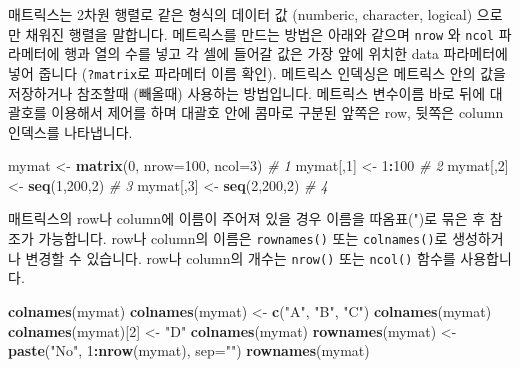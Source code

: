 \documentclass[
]{book}
\newenvironment{Shaded}{\begin{snugshade}}{\end{snugshade}}
\newcommand{\CommentTok}[1]{\textcolor[rgb]{0.56,0.35,0.01}{\textit{#1}}}
\newcommand{\DataTypeTok}[1]{\textcolor[rgb]{0.13,0.29,0.53}{#1}}
\newcommand{\DecValTok}[1]{\textcolor[rgb]{0.00,0.00,0.81}{#1}}
\newcommand{\KeywordTok}[1]{\textcolor[rgb]{0.13,0.29,0.53}{\textbf{#1}}}
\newcommand{\NormalTok}[1]{#1}
\newcommand{\OperatorTok}[1]{\textcolor[rgb]{0.81,0.36,0.00}{\textbf{#1}}}
\newcommand{\StringTok}[1]{\textcolor[rgb]{0.31,0.60,0.02}{#1}}
\begin{document}
매트릭스는 2차원 행렬로 같은 형식의 데이터 값 (numberic, character, logical) 으로만 채워진 행렬을 말합니다. 메트릭스를 만드는 방법은 아래와 같으며 \texttt{nrow} 와 \texttt{ncol} 파라메터에 행과 열의 수를 넣고 각 셀에 들어갈 값은 가장 앞에 위치한 data 파라메터에 넣어 줍니다 (\texttt{?matrix}로 파라메터 이름 확인). 메트릭스 인덱싱은 메트릭스 안의 값을 저장하거나 참조할때 (빼올때) 사용하는 방법입니다. 메트릭스 변수이름 바로 뒤에 대괄호를 이용해서 제어를 하며 대괄호 안에 콤마로 구분된 앞쪽은 row, 뒷쪽은 column 인덱스를 나타냅니다.

\begin{Shaded}
\begin{Highlighting}[]
\NormalTok{mymat <{-}}\StringTok{ }\KeywordTok{matrix}\NormalTok{(}\DecValTok{0}\NormalTok{, }\DataTypeTok{nrow=}\DecValTok{100}\NormalTok{, }\DataTypeTok{ncol=}\DecValTok{3}\NormalTok{) }\CommentTok{\# 1}
\NormalTok{mymat[,}\DecValTok{1}\NormalTok{] <{-}}\StringTok{ }\DecValTok{1}\OperatorTok{:}\DecValTok{100} \CommentTok{\# 2}
\NormalTok{mymat[,}\DecValTok{2}\NormalTok{] <{-}}\StringTok{ }\KeywordTok{seq}\NormalTok{(}\DecValTok{1}\NormalTok{,}\DecValTok{200}\NormalTok{,}\DecValTok{2}\NormalTok{) }\CommentTok{\# 3}
\NormalTok{mymat[,}\DecValTok{3}\NormalTok{] <{-}}\StringTok{ }\KeywordTok{seq}\NormalTok{(}\DecValTok{2}\NormalTok{,}\DecValTok{200}\NormalTok{,}\DecValTok{2}\NormalTok{) }\CommentTok{\# 4}
\end{Highlighting}
\end{Shaded}

매트릭스의 row나 column에 이름이 주어져 있을 경우 이름을 따옴표(")로 묶은 후 참조가 가능합니다. row나 column의 이름은 \texttt{rownames()} 또는 \texttt{colnames()}로 생성하거나 변경할 수 있습니다. row나 column의 개수는 \texttt{nrow()} 또는 \texttt{ncol()} 함수를 사용합니다.

\begin{Shaded}
\begin{Highlighting}[]
\KeywordTok{colnames}\NormalTok{(mymat)}
\KeywordTok{colnames}\NormalTok{(mymat) <{-}}\StringTok{ }\KeywordTok{c}\NormalTok{(}\StringTok{"A"}\NormalTok{, }\StringTok{"B"}\NormalTok{, }\StringTok{"C"}\NormalTok{)}
\KeywordTok{colnames}\NormalTok{(mymat)}
\KeywordTok{colnames}\NormalTok{(mymat)[}\DecValTok{2}\NormalTok{] <{-}}\StringTok{ "D"}
\KeywordTok{colnames}\NormalTok{(mymat)}
\KeywordTok{rownames}\NormalTok{(mymat) <{-}}\StringTok{ }\KeywordTok{paste}\NormalTok{(}\StringTok{"No"}\NormalTok{, }\DecValTok{1}\OperatorTok{:}\KeywordTok{nrow}\NormalTok{(mymat), }\DataTypeTok{sep=}\StringTok{""}\NormalTok{)}
\KeywordTok{rownames}\NormalTok{(mymat)}
\end{Highlighting}
\end{Shaded}
\end{document}
